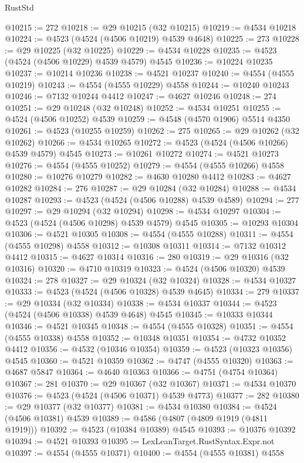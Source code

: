 \begin{lexlean}{RustStd}
\begin{coremodule}
@10215 := 272
@10218 := @29 @10215 (@32 @10215)
@10219 := @4534 @10218
@10224 := @4523 (@4524 (@4506 @10219) @4539 @4648)
@10225 := 273
@10228 := @29 @10225 (@32 @10225)
@10229 := @4534 @10228
@10235 := @4523 (@4524 (@4506 @10229) @4539 @4579) @4545
@10236 := @10224 @10235
@10237 := @10214 @10236
@10238 := @4521 @10237
@10240 := @4554 (@4555 @10219)
@10243 := @4554 (@4555 @10229) @4558
@10244 := @10240 @10243
@10246 := @7132 @10244 @4412
@10247 := @4627 @10246
@10248 := 274
@10251 := @29 @10248 (@32 @10248)
@10252 := @4534 @10251
@10255 := @4524 (@4506 @10252) @4539
@10259 := @4548 (@4570 @1906) @5514 @4350
@10261 := @4523 (@10255 @10259)
@10262 := 275
@10265 := @29 @10262 (@32 @10262)
@10266 := @4534 @10265
@10272 := @4523 (@4524 (@4506 @10266) @4539 @4579) @4545
@10273 := @10261 @10272
@10274 := @4521 @10273
@10276 := @4554 (@4555 @10252)
@10279 := @4554 (@4555 @10266) @4558
@10280 := @10276 @10279
@10282 := @4630 @10280 @4412
@10283 := @4627 @10282
@10284 := 276
@10287 := @29 @10284 (@32 @10284)
@10288 := @4534 @10287
@10293 := @4523 (@4524 (@4506 @10288) @4539 @4589)
@10294 := 277
@10297 := @29 @10294 (@32 @10294)
@10298 := @4534 @10297
@10304 := @4523 (@4524 (@4506 @10298) @4539 @4579) @4545
@10305 := @10293 @10304
@10306 := @4521 @10305
@10308 := @4554 (@4555 @10288)
@10311 := @4554 (@4555 @10298) @4558
@10312 := @10308 @10311
@10314 := @7132 @10312 @4412
@10315 := @4627 @10314
@10316 := 280
@10319 := @29 @10316 (@32 @10316)
@10320 := @4710 @10319
@10323 := @4524 (@4506 @10320) @4539
@10324 := 278
@10327 := @29 @10324 (@32 @10324)
@10328 := @4534 @10327
@10333 := @4523 (@4524 (@4506 @10328) @4539 @4645)
@10334 := 279
@10337 := @29 @10334 (@32 @10334)
@10338 := @4534 @10337
@10344 := @4523 (@4524 (@4506 @10338) @4539 @4648) @4545
@10345 := @10333 @10344
@10346 := @4521 @10345
@10348 := @4554 (@4555 @10328)
@10351 := @4554 (@4555 @10338) @4558
@10352 := @10348 @10351
@10354 := @4732 @10352 @4412
@10356 := @4532 (@10346 @10354)
@10359 := @4523 (@10323 @10356) @4545
@10360 := @4521 @10359
@10362 := @4747 (@4555 @10320)
@10363 := @4687 @5847
@10364 := @4640 @10363
@10366 := @4751 (@4754 @10364)
@10367 := 281
@10370 := @29 @10367 (@32 @10367)
@10371 := @4534 @10370
@10376 := @4523 (@4524 (@4506 @10371) @4539 @4773)
@10377 := 282
@10380 := @29 @10377 (@32 @10377)
@10381 := @4534 @10380
@10384 := @4524 (@4506 @10381) @4539
@10389 := @4586 (@4807 (@4809 @1919 (@4811 @1919)))
@10392 := @4523 (@10384 @10389) @4545
@10393 := @10376 @10392
@10394 := @4521 @10393
@10395 := LexLeanTarget.RustSyntax.Expr.not
@10397 := @4554 (@4555 @10371)
@10400 := @4554 (@4555 @10381) @4558

\end{coremodule}
\end{lexlean}
